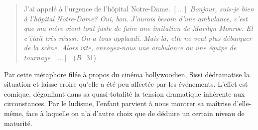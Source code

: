 \begin{quote}
  \begin{singlespace}
    \small
    J'ai appelé à l'urgence de l'hôpital Notre-Dame. $\left[ \dots \right]$ \textit{Bonjour, suis-je bien à l'hôpital Notre-Dame? Oui, bon. J'aurais besoin d'une ambulance, c'est que ma mère vient tout juste de faire une imitation de Marilyn Monroe. Et c'était très réussi. On a tous applaudi. Mais là, elle ne veut plus débarquer de la scène. Alors vite, envoyez-nous une ambulance ou une équipe de tournage $\left[ \dots \right]$}.~(\textit{B}:~31)
    \normalsize
  \end{singlespace}
\end{quote}
Par cette métaphore filée à propos du cinéma hollywoodien, Sissi dédramatise la situation et laisse croire qu'elle a été peu affectée par les événements.
L'effet est comique, dégonflant dans sa quasi-totalité la tension dramatique inhérente aux circonstances.
Par le ludisme, l'enfant parvient à nous montrer sa maîtrise d'elle-même, face à laquelle on n'a d'autre choix que de déduire un certain niveau de maturité.


